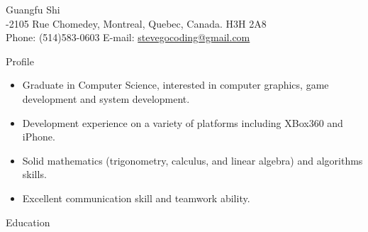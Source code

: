 \documentclass[10pt]{article}
\newenvironment{myitemize}{\begin{itemize} %
        \setlength{\itemsep}{0.25em} 
        \setlength{\topsep}{\itemsep} 
        \setlength{\labelsep}{1em}
        \setlength{\parskip}{0em}
        \setlength{\partopsep}{0em}
}%
{ \end{itemize} }
\begin{document}
 
\date{}
\newlength{\oldcvlabelwidth}
\newlength{\oldcvlabelsep}



\begin{cv} {{\large Guangfu Shi}\\
    { \normalsize {}-2105 Rue Chomedey, Montreal, Quebec, Canada. H3H 2A8\\ 
    Phone: {\mdseries (514)583-0603}  
    \hfill E-mail: {\mdseries \href{mailto:stevegocoding@gmail.com} {stevegocoding@gmail.com}}
    }
}


\setlength{\oldcvlabelwidth}{\cvlabelwidth}
\setlength{\oldcvlabelsep}{\cvlabelsep}
\setlength{\cvlabelwidth}{0.5em}

%

\begin{cvlist}{Profile} 
\item
    \begin{myitemize}
        \item Graduate in Computer Science, interested in computer graphics, game development and system development.
        \item Development experience on a variety of platforms including XBox360 and iPhone.
        \item Solid mathematics (trigonometry, calculus, and linear algebra) and algorithms skills. 
        \item Excellent communication skill and teamwork ability. 

    \end{myitemize}
\end{cvlist}


\setlength{\cvlabelwidth}{1em}

\begin{cvlist}{Education}
    

\end{cvlist}
\end{cv}
\end{document}
